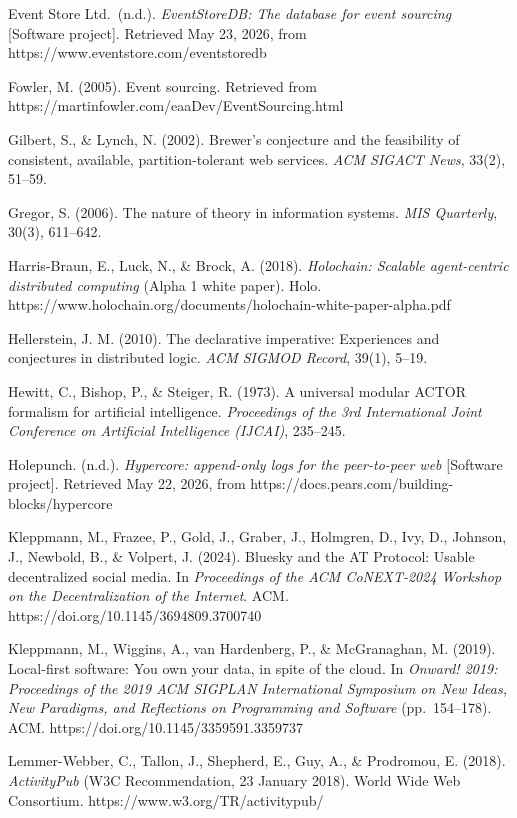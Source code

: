 \documentclass[
]{article}
\begin{document}
Event Store Ltd.~(n.d.). \emph{EventStoreDB: The database for event
sourcing} {[}Software project{]}. Retrieved May 23, 2026, from
https://www.eventstore.com/eventstoredb

Fowler, M. (2005). Event sourcing. Retrieved from
https://martinfowler.com/eaaDev/EventSourcing.html

Gilbert, S., \& Lynch, N. (2002). Brewer's conjecture and the
feasibility of consistent, available, partition-tolerant web services.
\emph{ACM SIGACT News}, 33(2), 51--59.

Gregor, S. (2006). The nature of theory in information systems.
\emph{MIS Quarterly}, 30(3), 611--642.

Harris-Braun, E., Luck, N., \& Brock, A. (2018). \emph{Holochain:
Scalable agent-centric distributed computing} (Alpha 1 white paper).
Holo.
https://www.holochain.org/documents/holochain-white-paper-alpha.pdf

Hellerstein, J. M. (2010). The declarative imperative: Experiences and
conjectures in distributed logic. \emph{ACM SIGMOD Record}, 39(1),
5--19.

Hewitt, C., Bishop, P., \& Steiger, R. (1973). A universal modular ACTOR
formalism for artificial intelligence. \emph{Proceedings of the 3rd
International Joint Conference on Artificial Intelligence (IJCAI)},
235--245.

Holepunch. (n.d.). \emph{Hypercore: append-only logs for the
peer-to-peer web} {[}Software project{]}. Retrieved May 22, 2026, from
https://docs.pears.com/building-blocks/hypercore

Kleppmann, M., Frazee, P., Gold, J., Graber, J., Holmgren, D., Ivy, D.,
Johnson, J., Newbold, B., \& Volpert, J. (2024). Bluesky and the AT
Protocol: Usable decentralized social media. In \emph{Proceedings of the
ACM CoNEXT-2024 Workshop on the Decentralization of the Internet}. ACM.
https://doi.org/10.1145/3694809.3700740

Kleppmann, M., Wiggins, A., van Hardenberg, P., \& McGranaghan, M.
(2019). Local-first software: You own your data, in spite of the cloud.
In \emph{Onward! 2019: Proceedings of the 2019 ACM SIGPLAN International
Symposium on New Ideas, New Paradigms, and Reflections on Programming
and Software} (pp.~154--178). ACM.
https://doi.org/10.1145/3359591.3359737

Lemmer-Webber, C., Tallon, J., Shepherd, E., Guy, A., \& Prodromou, E.
(2018). \emph{ActivityPub} (W3C Recommendation, 23 January 2018). World
Wide Web Consortium. https://www.w3.org/TR/activitypub/
\end{document}
